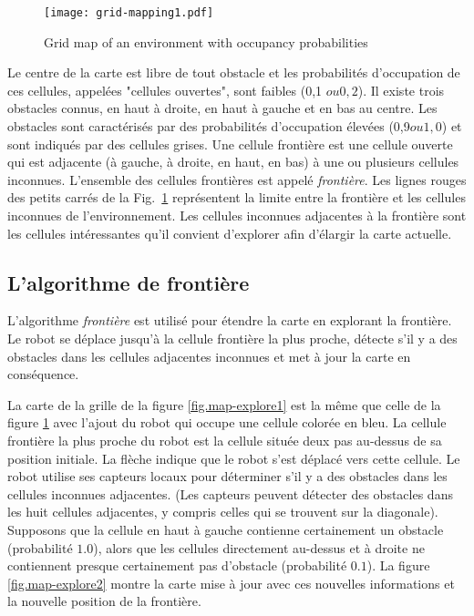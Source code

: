 \begin{figure}
\begin{center}
\texttt{[image: grid-mapping1.pdf]}
\end{center}
\caption{Grid map of an environment with occupancy probabilities}\label{fig.map-explore}
\end{figure}

Le centre de la carte est libre de tout obstacle et les probabilités d'occupation de ces cellules, appelées "cellules ouvertes", sont faibles (0,1 $ ou 0,2 $). Il existe trois obstacles connus, en haut à droite, en haut à gauche et en bas au centre. Les obstacles sont caractérisés par des probabilités d'occupation élevées (0,9$ ou 1,0$) et sont indiqués par des cellules grises. Une cellule frontière est une cellule ouverte qui est adjacente (à gauche, à droite, en haut, en bas) à une ou plusieurs cellules inconnues. L'ensemble des cellules frontières est appelé \emph{frontière}. Les lignes rouges des petits carrés de la Fig.~\ref{fig.map-explore} représentent la limite entre la frontière et les cellules inconnues de l'environnement. Les cellules inconnues adjacentes à la frontière sont les cellules intéressantes qu'il convient d'explorer afin d'élargir la carte actuelle.

\subsection{L'algorithme de frontière}

L'algorithme \emph{frontière} est utilisé pour étendre la carte en explorant la frontière. Le robot se déplace jusqu'à la cellule frontière la plus proche, détecte s'il y a des obstacles dans les cellules adjacentes inconnues et met à jour la carte en conséquence. 

La carte de la grille de la figure \ref{fig.map-explore1} est la même que celle de la figure \ref{fig.map-explore} avec l'ajout du robot qui occupe une cellule colorée en bleu. La cellule frontière la plus proche du robot est la cellule située deux pas au-dessus de sa position initiale. La flèche indique que le robot s'est déplacé vers cette cellule. Le robot utilise ses capteurs locaux pour déterminer s'il y a des obstacles dans les cellules inconnues adjacentes. (Les capteurs peuvent détecter des obstacles dans les huit cellules adjacentes, y compris celles qui se trouvent sur la diagonale). Supposons que la cellule en haut à gauche contienne certainement un obstacle (probabilité $1.0$), alors que les cellules directement au-dessus et à droite ne contiennent presque certainement pas d'obstacle (probabilité $0.1$). La figure \ref{fig.map-explore2} montre la carte mise à jour avec ces nouvelles informations et la nouvelle position de la frontière.


